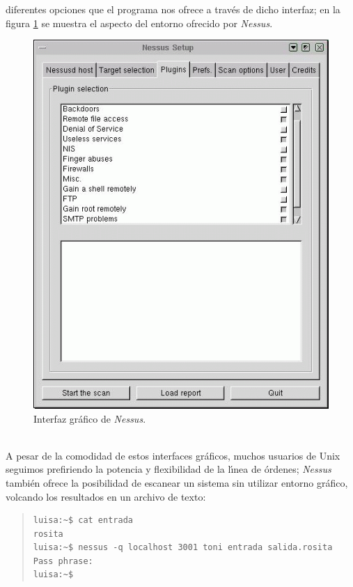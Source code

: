 diferentes opciones que el programa nos ofrece a trav\'es de dicho interfaz; en
la figura \ref{nessus} se muestra el aspecto del entorno ofrecido por {\it
Nessus}.\\
\begin{figure}
\begin{center}
\includegraphics{nessus.png}
\caption{Interfaz gr\'afico de {\it Nessus}.}
\label{nessus}
\end{center}
\end{figure}
\\A pesar de la comodidad de estos interfaces gr\'aficos, muchos usuarios de 
Unix seguimos prefiriendo la potencia y flexibilidad de la l\'{\i}nea de
\'ordenes; {\it Nessus} tambi\'en ofrece la posibilidad de escanear un sistema
sin utilizar entorno gr\'afico, volcando los resultados en un archivo de 
texto:
\begin{quote}
\begin{verbatim}
luisa:~$ cat entrada
rosita
luisa:~$ nessus -q localhost 3001 toni entrada salida.rosita
Pass phrase: 
luisa:~$
\end{verbatim}
\end{quote}

